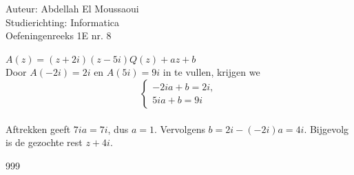 \documentclass[a4paper]{article}
\begin{document}
  
\noindent \large Auteur: Abdellah El Moussaoui \\
\noindent \large Studierichting: Informatica\\
\noindent \large Oefeningenreeks 1E nr. 8\\

\medskip

\normalsize

\medskip

$A(z) = (z + 2i)(z - 5i)Q(z) + az + b$\\

Door $A(-2i)=2i$ en $A(5i)=9i$ in te vullen, krijgen we
\[
\left\{
\begin{array}{l}
-2ia + b = 2i,\\
5ia + b = 9i
\end{array}
\right.
\]\\

Aftrekken geeft $7ia = 7i$, dus $a=1$. Vervolgens $b = 2i - (-2i)a = 4i$.
Bijgevolg is de gezochte rest $z + 4i$.\\

\begin{thebibliography}{999}
\end{thebibliography}
\end{document}
